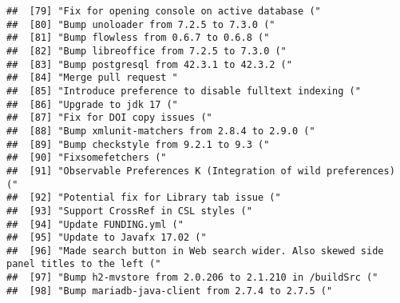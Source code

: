 \documentclass[
]{article}
\begin{document}
\begin{verbatim}
##  [79] "Fix for opening console on active database ("                                                                               
##  [80] "Bump unoloader from 7.2.5 to 7.3.0 ("                                                                                       
##  [81] "Bump flowless from 0.6.7 to 0.6.8 ("                                                                                        
##  [82] "Bump libreoffice from 7.2.5 to 7.3.0 ("                                                                                     
##  [83] "Bump postgresql from 42.3.1 to 42.3.2 ("                                                                                    
##  [84] "Merge pull request "                                                                                                        
##  [85] "Introduce preference to disable fulltext indexing ("                                                                        
##  [86] "Upgrade to jdk 17 ("                                                                                                        
##  [87] "Fix for DOI copy issues ("                                                                                                  
##  [88] "Bump xmlunit-matchers from 2.8.4 to 2.9.0 ("                                                                                
##  [89] "Bump checkstyle from 9.2.1 to 9.3 ("                                                                                        
##  [90] "Fixsomefetchers ("                                                                                                          
##  [91] "Observable Preferences K (Integration of wild preferences) ("                                                               
##  [92] "Potential fix for Library tab issue ("                                                                                      
##  [93] "Support CrossRef in CSL styles ("                                                                                           
##  [94] "Update FUNDING.yml ("                                                                                                       
##  [95] "Update to Javafx 17.02 ("                                                                                                   
##  [96] "Made search button in Web search wider. Also skewed side panel titles to the left ("                                        
##  [97] "Bump h2-mvstore from 2.0.206 to 2.1.210 in /buildSrc ("                                                                     
##  [98] "Bump mariadb-java-client from 2.7.4 to 2.7.5 ("                                                                             

\end{verbatim}
\end{document}
